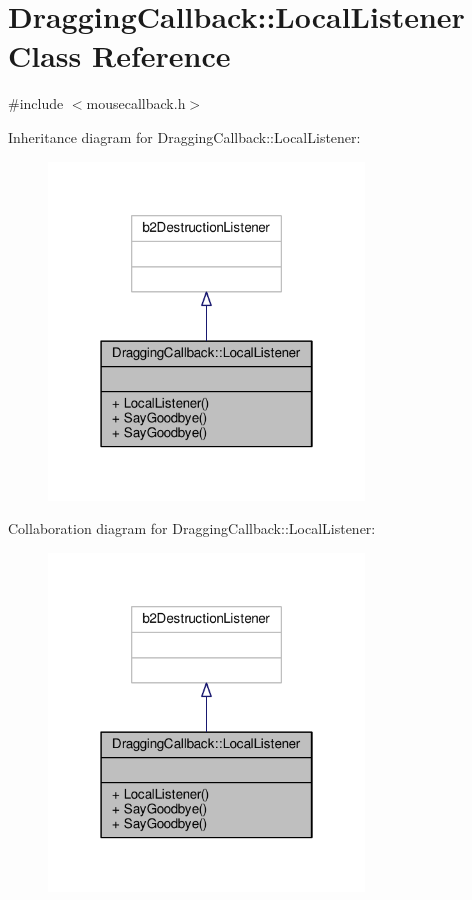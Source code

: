 \hypertarget{classDraggingCallback_1_1LocalListener}{}\section{Dragging\+Callback\+:\+:Local\+Listener Class Reference}
\label{classDraggingCallback_1_1LocalListener}


{\ttfamily \#include $<$mousecallback.\+h$>$}



Inheritance diagram for Dragging\+Callback\+:\+:Local\+Listener\+:\nopagebreak
\begin{figure}[H]
\begin{center}
\leavevmode
\includegraphics[width=238pt]{classDraggingCallback_1_1LocalListener__inherit__graph}
\end{center}
\end{figure}


Collaboration diagram for Dragging\+Callback\+:\+:Local\+Listener\+:\nopagebreak
\begin{figure}[H]
\begin{center}
\leavevmode
\includegraphics[width=238pt]{classDraggingCallback_1_1LocalListener__coll__graph}
\end{center}
\end{figure}

